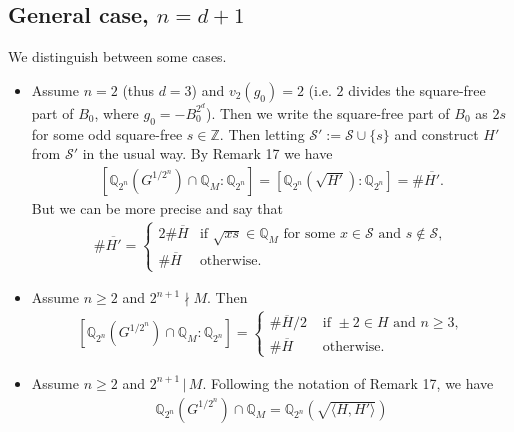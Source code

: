 \documentclass[10pt,a4paper]{article}
\theoremstyle{definition}
\begin{document}
\subsection{General case, $n=d+1$}
We distinguish between some cases.
\begin{itemize}
\item Assume $n=2$ (thus $d=3$) and $v_2(g_0)=2$ (i.e. $2$ divides the square-free part of $B_0$, where $g_0=-B_0^{2^d}$). Then we write the square-free part of $B_0$ as $2s$ for some odd square-free $s\in\mathbb{Z}$. Then letting $\mathcal{S}':=\mathcal{S}\cup \{s\}$ and construct $H'$ from $\mathcal{S}'$ in the usual way. By Remark 17 we have
\begin{align*}
\left[\mathbb{Q}_{2^n}\left(G^{1/2^n}\right)\cap \mathbb{Q}_M:\mathbb{Q}_{2^n}\right]=\left[\mathbb{Q}_{2^n}\left(\sqrt{H'}\right):\mathbb{Q}_{2^n}\right]=\#\overline{H'}.
\end{align*}
But we can be more precise and say that
\begin{align*}
\#\overline{H'}=\begin{cases}
2\#\overline{H}&\text{if }\sqrt{xs}\in\mathbb{Q}_M\text{ for some }x\in\mathcal{S}\text{ and }s\not\in \mathcal{S},\\
\#\overline{H}&\text{otherwise}.
\end{cases}
\end{align*}
\item Assume $n\geq 2$ and $2^{n+1}\nmid M$. Then
\begin{align*}
\left[\mathbb{Q}_{2^n}\left(G^{1/2^n}\right)\cap \mathbb{Q}_M:\mathbb{Q}_{2^n}\right]=\begin{cases}
\#\overline H/2 & \text{ if }\pm 2\in H\text{ and }n\geq 3,\\
\#\overline H&\text{ otherwise}.
\end{cases}
\end{align*}
\item Assume $n\geq 2$ and $2^{n+1}\,|\,M$. Following the notation of Remark 17, we have
\begin{align*}
\mathbb{Q}_{2^n}\left(G^{1/2^n}\right)\cap \mathbb{Q}_M=\mathbb{Q}_{2^n}\left(\sqrt{\langle H, H'\rangle}\right)

\end{align*}
\end{itemize}
\end{document}
